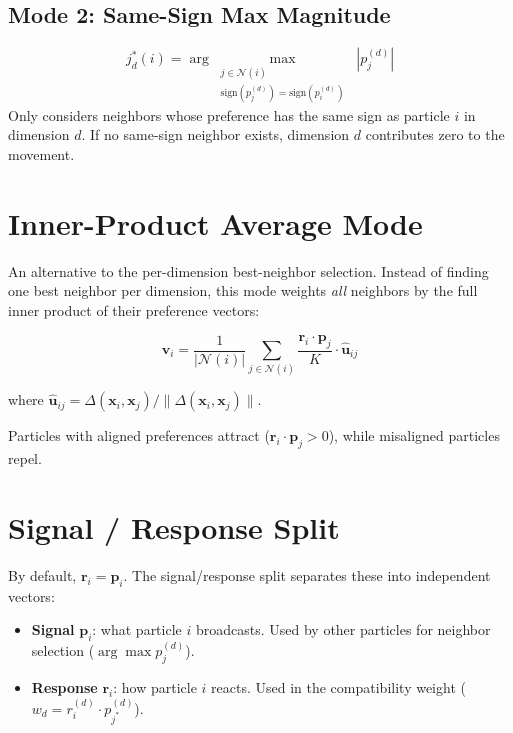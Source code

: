 \documentclass[11pt,a4paper]{article}
\begin{document}
\subsection{Mode 2: Same-Sign Max Magnitude}
\begin{equation}
j^*_d(i) = \arg\max_{\substack{j \in \mathcal{N}(i) \\ \mathrm{sign}(p_j^{(d)}) = \mathrm{sign}(p_i^{(d)})}} \; |p_j^{(d)}|
\end{equation}
Only considers neighbors whose preference has the same sign as particle $i$ in dimension $d$. If no same-sign neighbor exists, dimension $d$ contributes zero to the movement.

\section{Inner-Product Average Mode}

An alternative to the per-dimension best-neighbor selection. Instead of finding one best neighbor per dimension, this mode weights \emph{all} neighbors by the full inner product of their preference vectors:

\begin{equation}
\mathbf{v}_i = \frac{1}{|\mathcal{N}(i)|} \sum_{j \in \mathcal{N}(i)} \frac{\mathbf{r}_i \cdot \mathbf{p}_j}{K} \cdot \hat{\mathbf{u}}_{ij}
\end{equation}

where $\hat{\mathbf{u}}_{ij} = \Delta(\mathbf{x}_i, \mathbf{x}_j) / \|\Delta(\mathbf{x}_i, \mathbf{x}_j)\|$.

Particles with aligned preferences attract ($\mathbf{r}_i \cdot \mathbf{p}_j > 0$), while misaligned particles repel.

\section{Signal / Response Split}

By default, $\mathbf{r}_i = \mathbf{p}_i$. The signal/response split separates these into independent vectors:

\begin{itemize}[nosep]
\item \textbf{Signal} $\mathbf{p}_i$: what particle $i$ broadcasts. Used by other particles for neighbor selection ($\arg\max p_j^{(d)}$).
\item \textbf{Response} $\mathbf{r}_i$: how particle $i$ reacts. Used in the compatibility weight ($w_d = r_i^{(d)} \cdot p_{j^*}^{(d)}$).
\end{itemize}
\end{document}
